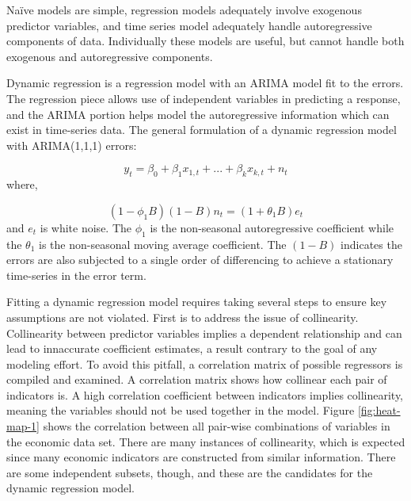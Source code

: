\documentclass[12pt,letterpaper,toc=flat,oneside]{report}
\theoremstyle{definition}
\theoremstyle{definition}
\theoremstyle{definition}
\theoremstyle{remark}
\begin{document}
Naïve models are simple, regression models adequately involve exogenous
predictor variables, and time series model adequately handle
autoregressive components of data. Individually these models are useful,
but cannot handle both exogenous and autoregressive components.

Dynamic regression is a regression model with an ARIMA model fit to the
errors. The regression piece allows use of independent variables in
predicting a response, and the ARIMA portion helps model the
autoregressive information which can exist in time-series data. The
general formulation of a dynamic regression model with ARIMA(1,1,1)
errors:

\[ y_t = \beta_0 + \beta_1x_{1,t} + ... + \beta_kx_{k,t} + n_t\] where,

\[ (1-\phi_1B)(1-B)n_t = (1+\theta_1B)e_t \] and \(e_t\) is white noise.
The \(\phi_1\) is the non-seasonal autoregressive coefficient while the
\(\theta_1\) is the non-seasonal moving average coefficient. The
\((1-B)\) indicates the errors are also subjected to a single order of
differencing to achieve a stationary time-series in the error term.

Fitting a dynamic regression model requires taking several steps to
ensure key assumptions are not violated. First is to address the issue
of collinearity. Collinearity between predictor variables implies a
dependent relationship and can lead to innaccurate coefficient
estimates, a result contrary to the goal of any modeling effort. To
avoid this pitfall, a correlation matrix of possible regressors is
compiled and examined. A correlation matrix shows how collinear each
pair of indicators is. A high correlation coefficient between indicators
implies collinearity, meaning the variables should not be used together
in the model. Figure \ref{fig:heat-map-1} shows the correlation between
all pair-wise combinations of variables in the economic data set. There
are many instances of collinearity, which is expected since many
economic indicators are constructed from similar information. There are
some independent subsets, though, and these are the candidates for the
dynamic regression model.
\end{document}
